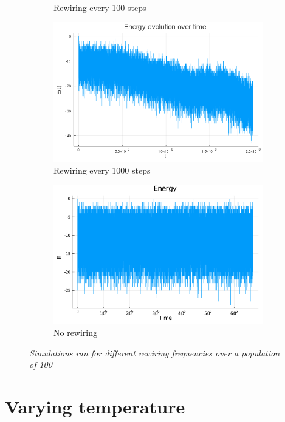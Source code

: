 \documentclass[12pt,openright,twoside]{book}
\begin{document}
\begin{figure}[!htb]
\begin{subfigure}{0.47\linewidth}
    \caption{Rewiring every 100 steps}
\end{subfigure}
\begin{subfigure}{0.47\linewidth}
    \includegraphics[width=\linewidth]{figures/2_2_1000rew/energy_evolution.png}
    \caption{Rewiring every 1000 steps}
\end{subfigure}
\begin{subfigure}{0.47\linewidth}
    \includegraphics[width=\linewidth]{figures/no_rew/Energy_norewire2.png}
    \caption{No rewiring}
\end{subfigure}
\caption{\textit{{\small Simulations ran for different rewiring frequencies over a population of 100}}}
\label{2_2_rew:all}
\end{figure}

\section{Varying temperature}
\end{document}
